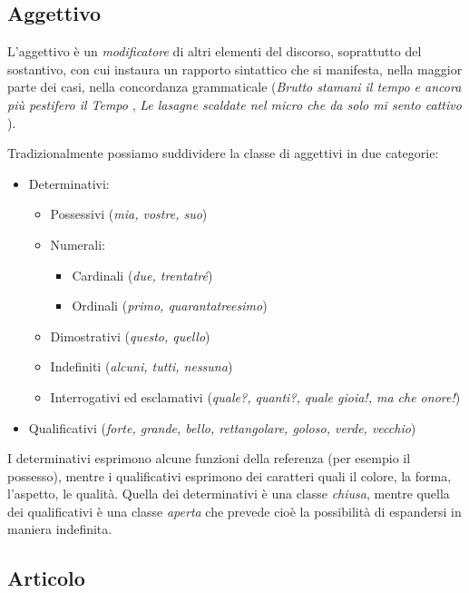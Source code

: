 \documentclass[a4paper,twoside,11pt,chapterprefix=false,bibliography=totocnumbered,listof=flat]{scrbook}
\providecommand{\tightlist}{%
  \setlength{\itemsep}{0pt}\setlength{\parskip}{0pt}}
\begin{document}
\hypertarget{aggettivo}{%
\subsection{Aggettivo}\label{aggettivo}}

L'aggettivo è un \emph{modificatore} di altri elementi del discorso,
soprattutto del sostantivo, con cui instaura un rapporto sintattico che
si manifesta, nella maggior parte dei casi, nella concordanza
grammaticale (\emph{Brutto stamani il tempo e ancora più pestifero il
Tempo} \citep{montale-satura}, \emph{Le lasagne scaldate nel micro che
da solo mi sento cattivo} \citep{fibra2017}).

Tradizionalmente possiamo suddividere la classe di aggettivi in due
categorie:

\begin{itemize}
\tightlist
\item
  Determinativi:

  \begin{itemize}
  \tightlist
  \item
    Possessivi (\emph{mia, vostre, suo})
  \item
    Numerali:

    \begin{itemize}
    \tightlist
    \item
      Cardinali (\emph{due, trentatré})
    \item
      Ordinali (\emph{primo, quarantatreesimo})
    \end{itemize}
  \item
    Dimostrativi (\emph{questo, quello})
  \item
    Indefiniti (\emph{alcuni, tutti, nessuna})
  \item
    Interrogativi ed esclamativi (\emph{quale?, quanti?, quale gioia!,
    ma che onore!})
  \end{itemize}
\item
  Qualificativi (\emph{forte, grande, bello, rettangolare, goloso,
  verde, vecchio})
\end{itemize}

I determinativi esprimono alcune funzioni della referenza (per esempio
il possesso), mentre i qualificativi esprimono dei caratteri quali il
colore, la forma, l'aspetto, le qualità. Quella dei determinativi è una
classe \emph{chiusa}, mentre quella dei qualificativi è una classe
\emph{aperta} che prevede cioè la possibilità di espandersi in maniera
indefinita.

\hypertarget{articolo}{%
\subsection{Articolo}\label{articolo}}
\end{document}
